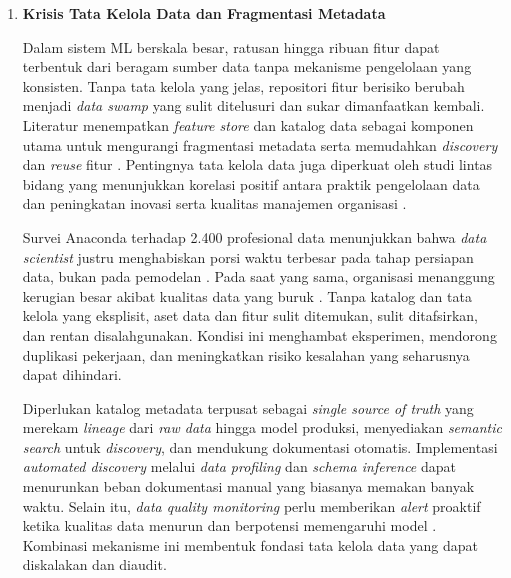 \vspace{0.5em}
\begin{enumerate}
    \item \textbf{Krisis Tata Kelola Data dan Fragmentasi Metadata}
    
    Dalam sistem ML berskala besar, ratusan hingga ribuan fitur dapat terbentuk dari beragam sumber data tanpa mekanisme pengelolaan yang konsisten. Tanpa tata kelola yang jelas, repositori fitur berisiko berubah menjadi \textit{data swamp} yang sulit ditelusuri dan sukar dimanfaatkan kembali. Literatur menempatkan \textit{feature store} dan katalog data sebagai komponen utama untuk mengurangi fragmentasi metadata serta memudahkan \textit{discovery} dan \textit{reuse} fitur \autocite{lamer2024data}. Pentingnya tata kelola data juga diperkuat oleh studi lintas bidang yang menunjukkan korelasi positif antara praktik pengelolaan data dan peningkatan inovasi serta kualitas manajemen organisasi \autocite{bernardo2024data}.
    
    \vspace{0.5em}

    Survei Anaconda terhadap 2.400 profesional data menunjukkan bahwa \textit{data scientist} justru menghabiskan porsi waktu terbesar pada tahap persiapan data, bukan pada pemodelan \autocite{anaconda2020state}. Pada saat yang sama, organisasi menanggung kerugian besar akibat kualitas data yang buruk \autocite{chien2022improve}. Tanpa katalog dan tata kelola yang eksplisit, aset data dan fitur sulit ditemukan, sulit ditafsirkan, dan rentan disalahgunakan. Kondisi ini menghambat eksperimen, mendorong duplikasi pekerjaan, dan meningkatkan risiko kesalahan yang seharusnya dapat dihindari.
    
    \vspace{0.5em}

    Diperlukan katalog metadata terpusat sebagai \textit{single source of truth} yang merekam \textit{lineage} dari \textit{raw data} hingga model produksi, menyediakan \textit{semantic search} untuk \textit{discovery}, dan mendukung dokumentasi otomatis. Implementasi \textit{automated discovery} melalui \textit{data profiling} dan \textit{schema inference} dapat menurunkan beban dokumentasi manual yang biasanya memakan banyak waktu. Selain itu, \textit{data quality monitoring} perlu memberikan \textit{alert} proaktif ketika kualitas data menurun dan berpotensi memengaruhi model \autocite{stoyanovich2020responsible}. Kombinasi mekanisme ini membentuk fondasi tata kelola data yang dapat diskalakan dan diaudit.
    

\end{enumerate}
